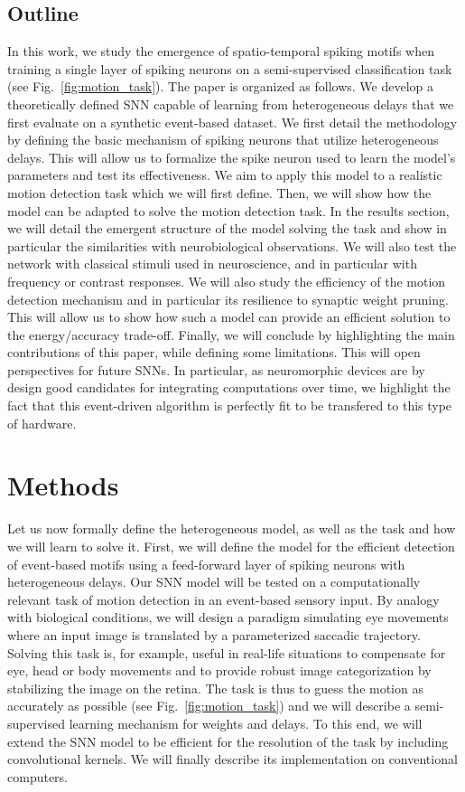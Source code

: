 \documentclass[default]{sn-jnl}%
\theoremstyle{thmstyleone}%
\theoremstyle{thmstyletwo}%
\theoremstyle{thmstylethree}%
\newcommand{\seeFig}[1]{see Fig.~\ref{fig:#1}}%
\begin{document}
\subsection{Outline}
In this work, we study the emergence of spatio-temporal spiking motifs when training a single layer of spiking neurons on a semi-supervised classification task (\seeFig{motion_task}). The paper is organized as follows. We develop a theoretically defined SNN capable of learning from heterogeneous delays that we first evaluate on a synthetic event-based dataset. We first detail the methodology by defining the basic mechanism of spiking neurons that utilize heterogeneous delays. This will allow us to formalize the spike neuron used to learn the model's parameters and test its effectiveness. We aim to apply this model to a realistic motion detection task which we will first define. Then, we will show how the model can be adapted to solve the motion detection task. In the results section, we will detail the emergent structure of the model solving the task and show in particular the similarities with neurobiological observations. We will also test the network with classical stimuli used in neuroscience, and in particular with frequency or contrast responses.  We will also study the efficiency of the motion detection mechanism and in particular its resilience to synaptic weight pruning. This will allow us to show how such a model can provide an efficient solution to the energy/accuracy trade-off.  Finally, we will conclude by highlighting the main contributions of this paper, while defining some limitations. This will open perspectives for future SNNs.  In particular, as neuromorphic devices are by design good candidates for integrating computations over time, we highlight the fact that this event-driven algorithm is perfectly fit to be transfered to this type of hardware.
%
\section{Methods}
\label{sec:methods}
Let us now formally define the heterogeneous model, as well as the task and how we will learn to solve it. First, we will define the model for the efficient detection of event-based motifs using a feed-forward layer of spiking neurons with heterogeneous delays. Our SNN model will be tested on a computationally relevant task of motion detection in an event-based sensory input. By analogy with biological conditions, we will design a paradigm simulating eye movements where an input image is translated by a parameterized saccadic trajectory. Solving this task is, for example, useful in real-life situations to compensate for eye, head or body movements and to provide robust image categorization by stabilizing the image on the retina. The task is thus to guess the motion as accurately as possible (\seeFig{motion_task}) and we will describe a semi-supervised learning mechanism for weights and delays. To this end, we will extend the SNN model to be efficient for the resolution of the task by including convolutional kernels. We will finally describe its implementation on conventional computers. 
%
\end{document}
